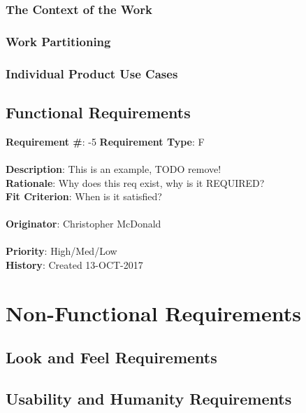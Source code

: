 \documentclass[11pt]{article}
\begin{document}
\subsubsection{The Context of the Work}
\subsubsection{Work Partitioning}
\subsubsection{Individual Product Use Cases}

\subsection{Functional Requirements}

\begin{framed}
	\noindent\textbf{Requirement \#}: -5 \hfill \textbf{Requirement Type}: F \hfill\\\\
	\noindent\textbf{Description}: This is an example, TODO remove!  \\
	\textbf{Rationale}: Why does this req exist, why is it REQUIRED? \\
	\textbf{Fit Criterion}: When is it satisfied? \\\\
	\textbf{Originator}: Christopher McDonald \\\\
	\textbf{Priority}: High/Med/Low \hfill \\
	\noindent\textbf{History}: Created 13-OCT-2017
\end{framed}


\section{Non-Functional Requirements}

\subsection{Look and Feel Requirements}

\subsection{Usability and Humanity Requirements}
\end{document}
